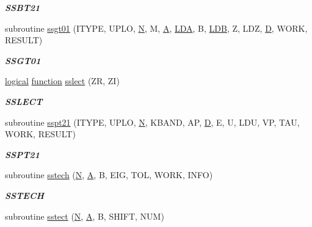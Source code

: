\begin{DoxyCompactItemize}
\begin{DoxyCompactList}\small\item\em {\bfseries S\+S\+B\+T21} \end{DoxyCompactList}\item 
subroutine \hyperlink{group__single__eig_ga2e1600d5ba10895a2ed94275d190b187}{ssgt01} (I\+T\+Y\+P\+E, U\+P\+L\+O, \hyperlink{polmisc_8c_a0240ac851181b84ac374872dc5434ee4}{N}, M, \hyperlink{classA}{A}, \hyperlink{example__user_8c_ae946da542ce0db94dced19b2ecefd1aa}{L\+D\+A}, B, \hyperlink{example__user_8c_a50e90a7104df172b5a89a06c47fcca04}{L\+D\+B}, Z, L\+D\+Z, \hyperlink{odrpack_8h_a7dae6ea403d00f3687f24a874e67d139}{D}, W\+O\+R\+K, R\+E\+S\+U\+L\+T)
\begin{DoxyCompactList}\small\item\em {\bfseries S\+S\+G\+T01} \end{DoxyCompactList}\item 
\hyperlink{tnc_8c_aa7b64cdf39500931f7b333343791a104}{logical} \hyperlink{afunc_8m_a7b5e596df91eadea6c537c0825e894a7}{function} \hyperlink{group__single__eig_ga9051201041524e344b189e8504011c6f}{sslect} (Z\+R, Z\+I)
\begin{DoxyCompactList}\small\item\em {\bfseries S\+S\+L\+E\+C\+T} \end{DoxyCompactList}\item 
subroutine \hyperlink{group__single__eig_gad6ad2fe75e582845dea427676497bbca}{sspt21} (I\+T\+Y\+P\+E, U\+P\+L\+O, \hyperlink{polmisc_8c_a0240ac851181b84ac374872dc5434ee4}{N}, K\+B\+A\+N\+D, A\+P, \hyperlink{odrpack_8h_a7dae6ea403d00f3687f24a874e67d139}{D}, E, U, L\+D\+U, V\+P, T\+A\+U, W\+O\+R\+K, R\+E\+S\+U\+L\+T)
\begin{DoxyCompactList}\small\item\em {\bfseries S\+S\+P\+T21} \end{DoxyCompactList}\item 
subroutine \hyperlink{group__single__eig_ga455b022ce67894011ee08a1a4b0eb1ad}{sstech} (\hyperlink{polmisc_8c_a0240ac851181b84ac374872dc5434ee4}{N}, \hyperlink{classA}{A}, B, E\+I\+G, T\+O\+L, W\+O\+R\+K, I\+N\+F\+O)
\begin{DoxyCompactList}\small\item\em {\bfseries S\+S\+T\+E\+C\+H} \end{DoxyCompactList}\item 
subroutine \hyperlink{group__single__eig_ga1f72bc4c21b1b37d449ec5911e36d7d1}{sstect} (\hyperlink{polmisc_8c_a0240ac851181b84ac374872dc5434ee4}{N}, \hyperlink{classA}{A}, B, S\+H\+I\+F\+T, N\+U\+M)

\end{DoxyCompactItemize}

